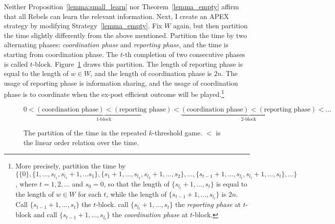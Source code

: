 \documentclass[12pt,letter]{article}
\theoremstyle{definition}
\theoremstyle{remark}
\theoremstyle{claim}
\begin{document}
Neither Proposition~\ref{lemma:small_learn} nor Theorem~\ref{lemma_empty} affirm that all Rebels can learn the relevant information. Next, I create an APEX strategy by modifying Strategy~\ref{lemma_empty}. Fix $W$ again, but then partition the time slightly differently from the above mentioned. Partition the time by two alternating phases: \textit{coordination phase} and \textit{reporting phase}, and the time is starting from coordination phase. The $t$-th completion of two consecutive phases is called $t$-block. Figure~\ref{fig:ordered_original_game_intro} draws this partition. The length of reporting phase is equal to the length of $w\in W$, and the length of coordination phase is $2n$. The usage of reporting phase is information sharing, and the usage of coordination phase is to coordinate when the ex-post efficient outcome will be played.\footnote{More precisely, partition the time by $\{\{0\},\{1,...,s_{l_1},s_{l_1}+1,...s_1\},\{s_1+1,...,s_{l_2},s_{l_2}+1,...,s_2\},...,\{s_{t-1}+1,...,s_{l_{t}},s_{l_t}+1,...,s_t\},...\}$, where $t=1,2,...$ and $s_{0}=0$, so that the length of $\{s_{l_t}+1,...,s_t\}$ is equal to the length of $w\in W$ for each $t$, while the length of $\{s_{t-1}+1,...,s_{l_t}\}$ is $2n$. Call $\{s_{t-1}+1,...,s_t\}$ the $t$-block. call $\{s_{l_t}+1,...,s_t\}$ the \textit{reporting phase} at $t$-block and call $\{s_{t-1}+1,...,s_{l_t}\}$ the \textit{coordination phase} at $t$-block.}
\begin{figure}
\[0<\underbrace{(\text{coordination phase})<(\text{reporting phase})}_{\text{$1$-block}}<\underbrace{(\text{coordination phase})<(\text{reporting phase})}_{\text{$2$-block}}<...\]
\caption{The partition of the time in the repeated $k$-threshold game. $<$ is the linear order relation over the time.}
\label{fig:ordered_original_game_intro}
\end{figure}
\end{document}
